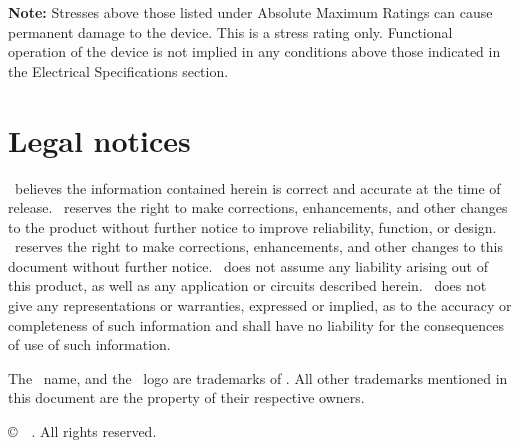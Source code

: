 \documentclass[10pt]{datasheet}
\begin{document}
	\textbf{Note:} Stresses above those listed under Absolute Maximum Ratings can
	cause permanent damage to the device. This is a stress rating only. Functional
	operation of the device is not implied in any conditions above those indicated
	in the Electrical Specifications section.

\clearpage

\begin{versionhistory}
\end{versionhistory}

\section{Legal notices}

\Company\ believes the information contained herein is correct and accurate at the time of release. 
\Company\ reserves the right to make corrections, enhancements, and other changes to the product without further notice to improve reliability, function, or design.
\Company\ reserves the right to make corrections, enhancements, and other changes to this document without further notice.
\Company\ does not assume any liability arising out of this product, as well as any application or circuits described herein.
\Company\ does not give any representations or warranties, expressed or implied, as to the accuracy or completeness of such information and shall have no liability for the consequences of use of such information.

The \Company\ name, and the \Author\ logo are trademarks of \Company. All other trademarks mentioned in this document are the property of their respective owners.

\copyright\ \the\year\ \Company. All rights reserved.
\end{document}
